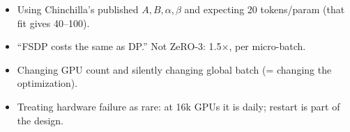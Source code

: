\begin{trap}
\begin{itemize}
\item Using Chinchilla's published $A,B,\alpha,\beta$ and expecting 20 tokens/param (that fit gives 40--100).
\item ``FSDP costs the same as DP.'' Not ZeRO-3: 1.5$\times$, per micro-batch.
\item Changing GPU count and silently changing global batch (= changing the optimization).
\item Treating hardware failure as rare: at 16k GPUs it is daily; restart is part of the design.
\end{itemize}
\end{trap}
